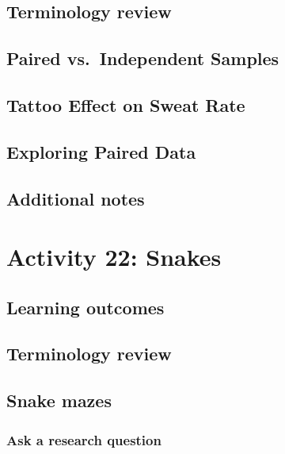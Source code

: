 \documentclass[
]{report}
\begin{document}
\subsection{Terminology review}\label{terminology-review-18}

\subsection{Paired vs.~Independent Samples}\label{paired-vs.-independent-samples-1}

\subsection{Tattoo Effect on Sweat Rate}\label{tattoo-effect-on-sweat-rate}

\subsection{Exploring Paired Data}\label{exploring-paired-data}

\subsection{Additional notes}\label{additional-notes-20}

\section{Activity 22: Snakes}\label{activity-22-snakes}

\subsection{Learning outcomes}\label{learning-outcomes-24}

\subsection{Terminology review}\label{terminology-review-19}

\subsection{Snake mazes}\label{snake-mazes}

\subsubsection*{Ask a research question}\label{ask-a-research-question-4}
\end{document}
